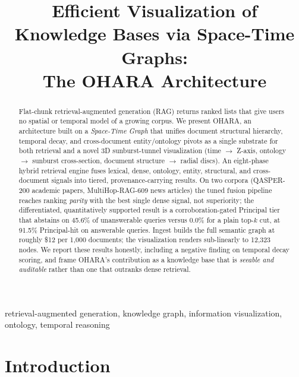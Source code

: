 \documentclass[conference,a4paper]{IEEEtran}
\begin{document}
\title{Efficient Visualization of Knowledge Bases via Space-Time Graphs:\\ The OHARA Architecture}

\author{
}

\maketitle

\begin{abstract}
Flat-chunk retrieval-augmented generation (RAG) returns ranked lists that give users no spatial or temporal model of a growing corpus. We present OHARA, an architecture built on a \emph{Space-Time Graph} that unifies document structural hierarchy, temporal decay, and cross-document entity/ontology pivots as a single substrate for both retrieval and a novel 3D sunburst-tunnel visualization (time $\to$ Z-axis, ontology $\to$ sunburst cross-section, document structure $\to$ radial discs). An eight-phase hybrid retrieval engine fuses lexical, dense, ontology, entity, structural, and cross-document signals into tiered, provenance-carrying results. On two corpora (QASPER-200 academic papers, MultiHop-RAG-609 news articles) the tuned fusion pipeline reaches ranking \emph{parity} with the best single dense signal, not superiority; the differentiated, quantitatively supported result is a corroboration-gated Principal tier that abstains on 45.6\% of unanswerable queries versus 0.0\% for a plain top-$k$ cut, at 91.5\% Principal-hit on answerable queries. Ingest builds the full semantic graph at roughly \$12 per 1{,}000 documents; the visualization renders sub-linearly to 12{,}323 nodes. We report these results honestly, including a negative finding on temporal decay scoring, and frame OHARA's contribution as a knowledge base that is \emph{seeable and auditable} rather than one that outranks dense retrieval.
\end{abstract}

\begin{IEEEkeywords}
retrieval-augmented generation, knowledge graph, information visualization, ontology, temporal reasoning
\end{IEEEkeywords}

\section{Introduction}
\end{document}
